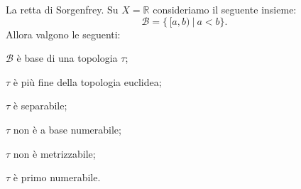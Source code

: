 \documentclass{article}
\begin{document}
\begin{ex}
	La retta di Sorgenfrey. Su $X=\mathbb{R}$ consideriamo il seguente insieme:
	$${\mathcal{B}=\{\,[a, b)\ |\ a<b\}}.$$
    Allora valgono le seguenti:
	\begin{nlist}
		\item $\mathcal{B}$ è base di una topologia $\tau$;
		\item $\tau$ \`e pi\`u fine della topologia euclidea;
		\item $\tau$ è separabile;
		\item $\tau$ non è a base numerabile;
		\item $\tau$ non è metrizzabile;
		\item $\tau$ è primo numerabile.
	\end{nlist}
\end{ex}
\end{document}

